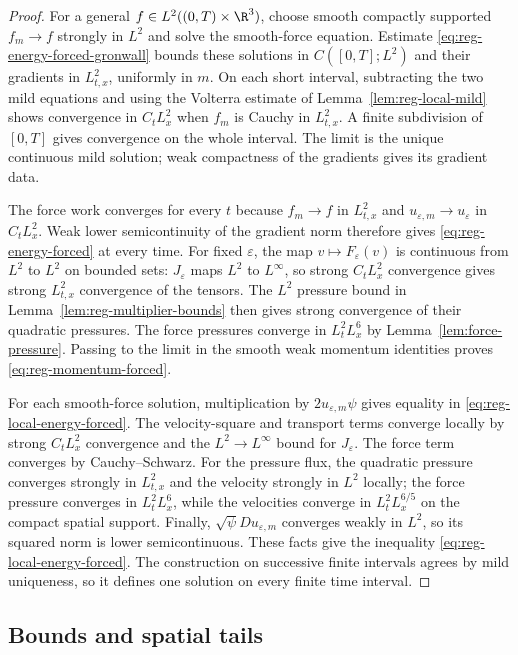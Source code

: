 \documentclass[11pt,reqno]{amsart}
\begin{document}
\begin{proof}
For a general $f\in L^2((0,T)\times\R^3)$, choose smooth compactly
supported $f_m\to f$ strongly in $L^2$ and solve the smooth-force equation.
Estimate \eqref{eq:reg-energy-forced-gronwall} bounds these solutions in
$C([0,T];L^2)$ and their gradients in $L^2_{t,x}$, uniformly in $m$.
On each short interval, subtracting the two mild equations and using the
Volterra estimate of Lemma~\ref{lem:reg-local-mild} shows convergence in
$C_tL^2_x$ when $f_m$ is Cauchy in $L^2_{t,x}$. A finite subdivision of
$[0,T]$ gives convergence on the whole interval. The limit is the unique
continuous mild solution; weak compactness of the gradients gives its
gradient data.

The force work converges for every $t$ because
$f_m\to f$ in $L^2_{t,x}$ and $u_{\varepsilon,m}\to u_\varepsilon$ in
$C_tL^2_x$. Weak lower semicontinuity of the gradient norm therefore gives
\eqref{eq:reg-energy-forced} at every time. For fixed $\varepsilon$, the
map $v\mapsto F_\varepsilon(v)$ is continuous from $L^2$ to $L^2$ on
bounded sets: $J_\varepsilon$ maps $L^2$ to $L^\infty$, so strong
$C_tL^2_x$ convergence gives strong $L^2_{t,x}$ convergence of the
tensors. The $L^2$ pressure bound in Lemma~\ref{lem:reg-multiplier-bounds}
then gives strong convergence of their quadratic pressures. The force
pressures converge in $L^2_tL^6_x$ by
Lemma~\ref{lem:force-pressure}. Passing to the limit in the smooth weak
momentum identities proves \eqref{eq:reg-momentum-forced}.

For each smooth-force solution, multiplication by
$2u_{\varepsilon,m}\psi$ gives equality in
\eqref{eq:reg-local-energy-forced}. The velocity-square and transport
terms converge locally by strong $C_tL^2_x$ convergence and the
$L^2\to L^\infty$ bound for $J_\varepsilon$. The force term converges by
Cauchy--Schwarz. For the pressure flux, the quadratic pressure converges
strongly in $L^2_{t,x}$ and the velocity strongly in $L^2$ locally; the
force pressure converges in $L^2_tL^6_x$, while the velocities converge in
$L^2_tL^{6/5}_x$ on the compact spatial support. Finally,
$\sqrt\psi Du_{\varepsilon,m}$ converges weakly in $L^2$, so its squared
norm is lower semicontinuous. These facts give the inequality
\eqref{eq:reg-local-energy-forced}. The construction on successive finite
intervals agrees by mild uniqueness, so it defines one solution on every
finite time interval.
\end{proof}
\subsection{Bounds and spatial tails}
\end{document}
